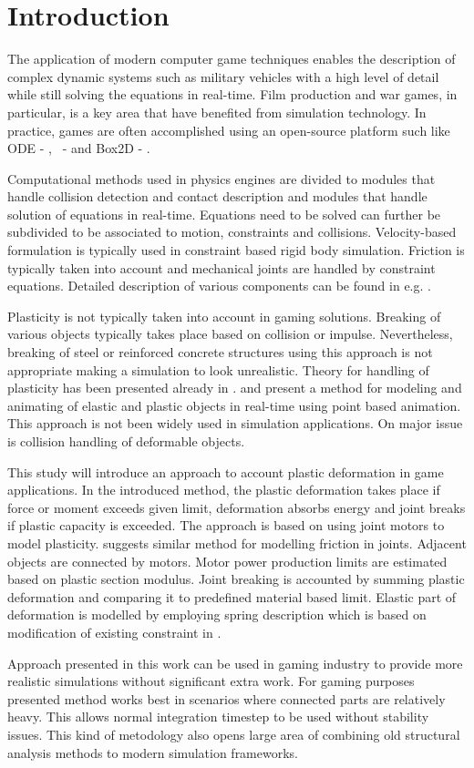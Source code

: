 \section{Introduction}

The application of modern computer game techniques enables the description of complex dynamic systems 
such as military vehicles with a high level of detail while still solving the equations in real-time.
Film production and war games, in particular, is a key area that have benefited from simulation technology. 
In practice, games are often accomplished using an open-source platform such 
like ODE - \cite{ode}, \bullet\ - \cite{bullet} and Box2D - \cite{box2d}.

Computational methods used in physics engines are divided to modules that handle collision detection and 
contact description and modules that handle solution of equations in real-time. Equations need to be 
solved can further be subdivided to be associated to motion, constraints and collisions. 
Velocity-based formulation is typically used in constraint based rigid body simulation. 
Friction is typically taken into account and mechanical joints are handled by constraint equations.
Detailed description of various components can be found in e.g. \cite{erleben.thesis}.

Plasticity is not typically taken into account in gaming solutions. 
Breaking of various objects typically takes place based on collision or impulse.
Nevertheless, breaking of steel or reinforced concrete structures using this approach 
is not appropriate making a simulation to look unrealistic. Theory for handling of plasticity 
has been presented already in \cite{cg1988}. \cite{muller2004point} and \cite{muller2005meshless} 
present a method for modeling and animating of elastic and plastic objects in real-time using 
point based animation. This approach is not been widely used in simulation applications.  
On major issue is collision handling of deformable objects.

This study will introduce an approach to account plastic deformation in game applications.   
In the introduced method, the plastic deformation takes place if force or moment exceeds given 
limit, deformation absorbs energy and joint breaks if plastic capacity is exceeded. 
The approach is based on using joint motors to model plasticity. \citet[p.~90]{erleben.thesis} 
suggests similar method for modelling friction in joints. Adjacent objects are connected by motors. 
Motor power production limits are estimated based on plastic section modulus. 
Joint breaking is accounted by summing plastic deformation and comparing it to 
predefined material based limit. Elastic part of deformation is modelled by employing 
spring description which is based on modification of existing constraint in \bullet.

Approach presented in this work can be used in gaming industry to provide more realistic 
simulations without significant extra work. For gaming purposes presented method works 
best in scenarios where connected parts are relatively heavy. This allows normal 
integration timestep to be used without stability issues. 
This kind of metodology also opens large area of combining old structural analysis
methods to modern simulation frameworks.

